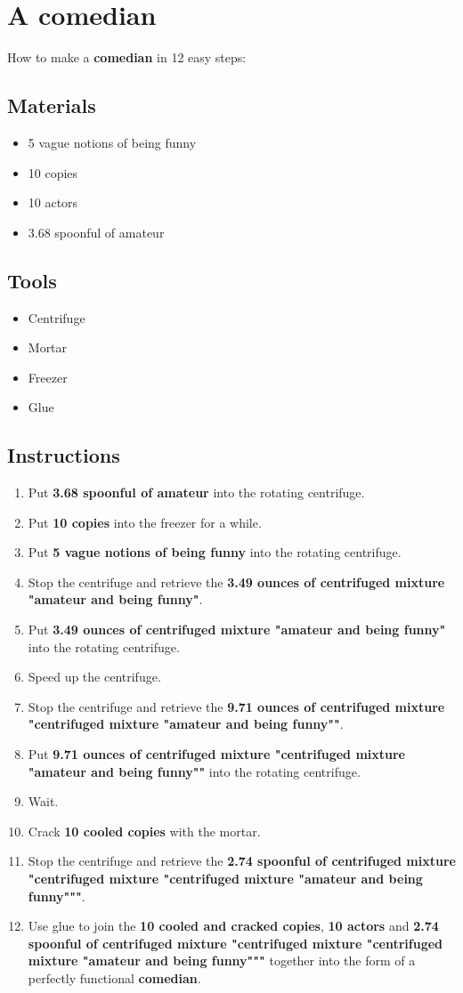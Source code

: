 \documentclass{article}
\begin{document}
\section{A comedian}How to make a \textbf{comedian} in 12 easy steps:

\subsection{Materials}\begin{itemize}
\item 
5 vague notions of being funny
\item 
10 copies
\item 
10 actors
\item 
3.68 spoonful of amateur
\end{itemize}
\subsection{Tools}\begin{itemize}
\item 
Centrifuge
\item 
Mortar
\item 
Freezer
\item 
Glue
\end{itemize}
\subsection{Instructions}\begin{enumerate}
\item 
Put \textbf{3.68 spoonful of amateur} into the rotating centrifuge.
\item 
Put \textbf{10 copies} into the freezer for a while.
\item 
Put \textbf{5 vague notions of being funny} into the rotating centrifuge.
\item 
Stop the centrifuge and retrieve the \textbf{3.49 ounces of centrifuged mixture "amateur and being funny"}.
\item 
Put \textbf{3.49 ounces of centrifuged mixture "amateur and being funny"} into the rotating centrifuge.
\item 
Speed up the centrifuge.
\item 
Stop the centrifuge and retrieve the \textbf{9.71 ounces of centrifuged mixture "centrifuged mixture "amateur and being funny""}.
\item 
Put \textbf{9.71 ounces of centrifuged mixture "centrifuged mixture "amateur and being funny""} into the rotating centrifuge.
\item 
Wait.
\item 
Crack \textbf{10 cooled copies} with the mortar.
\item 
Stop the centrifuge and retrieve the \textbf{2.74 spoonful of centrifuged mixture "centrifuged mixture "centrifuged mixture "amateur and being funny"""}.
\item 
Use glue to join the \textbf{10 cooled and cracked copies}, \textbf{10 actors} and \textbf{2.74 spoonful of centrifuged mixture "centrifuged mixture "centrifuged mixture "amateur and being funny"""} together into the form of a perfectly functional \textbf{comedian}.
\end{enumerate}
\newpage
\end{document}
